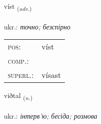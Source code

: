 \documentclass[frontgrid, backgrid]{flacards}\usepackage[]{graphicx}\usepackage[]{xcolor}
\begin{document}
\renewcommand{\flhead}{\vskip5pt \fboxsep=0pt {\small\bfseries\footnotesize Atviksorð | прислівник}}
\renewcommand{\fcfoot}{\vskip5pt \fboxsep=0pt \hspace{2pt}{\small\bfseries\footnotesize 1K}}

\renewcommand{\blhead}{\vskip5pt {\small\bfseries\footnotesize Atviksorð | прислівник }}
\renewcommand{\bcfoot}{\vskip5pt \hspace{2pt}{\small\bfseries\footnotesize 1K}}


{víst \small{\textsubscript{(\textit{adv.})}} \\[1ex] %
\textphonetic{[vist]} \\
ukr.: \emph{точно; безспірно} \\  [2ex]
\renewcommand*{\arraystretch}{0.8}
\begin{tabular}{ll}
\textsc{pos}: & víst \\ 
\textsc{comp.}: &  \\ 
\textsc{superl.}: & vísast \\
\end{tabular}
}

\renewcommand{\flhead}{\vskip5pt \fboxsep=0pt {\small\bfseries\footnotesize Nafnorð | іменник}}
\renewcommand{\fcfoot}{\vskip5pt \fboxsep=0pt \hspace{2pt}{\small\bfseries\footnotesize 1K}}

\renewcommand{\blhead}{\vskip5pt {\small\bfseries\footnotesize Nafnorð | іменник }}
\renewcommand{\bcfoot}{\vskip5pt \hspace{2pt}{\small\bfseries\footnotesize 1K}}


{viðtal \small{\textsubscript{(\textit{n.})}} \\[1ex] %
\textphonetic{[vɪðtʰal]} \\
ukr.: \emph{інтерв'ю; бесіда; розмова} \\  [2ex]
\renewcommand*{\arraystretch}{0.8}
}
\end{document}
